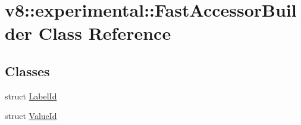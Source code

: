 \hypertarget{classv8_1_1experimental_1_1_fast_accessor_builder}{}\section{v8\+:\+:experimental\+:\+:Fast\+Accessor\+Builder Class Reference}
\label{classv8_1_1experimental_1_1_fast_accessor_builder}
\subsection*{Classes}
\begin{DoxyCompactItemize}
\item 
struct \hyperlink{structv8_1_1experimental_1_1_fast_accessor_builder_1_1_label_id}{Label\+Id}
\item 
struct \hyperlink{structv8_1_1experimental_1_1_fast_accessor_builder_1_1_value_id}{Value\+Id}
\end{DoxyCompactItemize}
